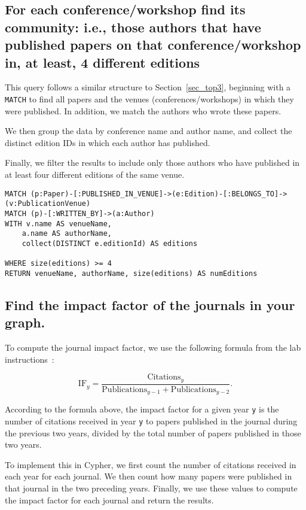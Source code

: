 \documentclass{article}
\begin{document}
\subsection{For each conference/workshop find its community: i.e., those authors that have
published papers on that conference/workshop in, at least, 4 different editions}

This query follows a similar structure to Section~\ref{sec_top3}, beginning with a \texttt{MATCH} to find all papers and the venues (conferences/workshops) in which they were published. In addition, we match the authors who wrote these papers.

We then group the data by conference name and author name, and collect the distinct edition IDs in which each author has published. 

Finally, we filter the results to include only those authors who have published in at least four different editions of the same venue.

\begin{verbatim}
MATCH (p:Paper)-[:PUBLISHED_IN_VENUE]->(e:Edition)-[:BELONGS_TO]->(v:PublicationVenue)
MATCH (p)-[:WRITTEN_BY]->(a:Author)
WITH v.name AS venueName, 
    a.name AS authorName, 
    collect(DISTINCT e.editionId) AS editions
                 
WHERE size(editions) >= 4
RETURN venueName, authorName, size(editions) AS numEditions
\end{verbatim}

\subsection{Find the impact factor of the journals in your graph.}

To compute the journal impact factor, we use the following formula from the lab instructions~\cite{wikipediacontributors_2020_impact}:

\[
\mathrm{IF}_y = \frac{\mathrm{Citations}_y}{\mathrm{Publications}_{y-1} + \mathrm{Publications}_{y-2}}.
\]

According to the formula above, the impact factor for a given year \texttt{y} is the number of citations received in year \texttt{y} to papers published in the journal during the previous two years, divided by the total number of papers published in those two years.

To implement this in Cypher, we first count the number of citations received in each year for each journal. We then count how many papers were published in that journal in the two preceding years. Finally, we use these values to compute the impact factor for each journal and return the results.
\end{document}

